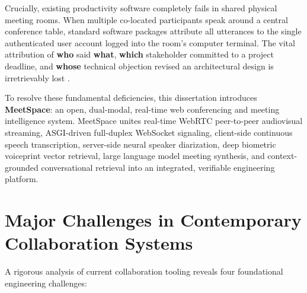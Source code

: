 \documentclass[12pt,oneside,letterpaper]{report}
\numberwithin{equation}{chapter} %
\begin{document}
Crucially, existing productivity software completely fails in shared physical meeting rooms. When multiple co-located participants speak around a central conference table, standard software packages attribute all utterances to the single authenticated user account logged into the room's computer terminal. The vital attribution of \textbf{who} said \textbf{what}, \textbf{which} stakeholder committed to a project deadline, and \textbf{whose} technical objection revised an architectural design is irretrievably lost \cite{qian2022single}.

To resolve these fundamental deficiencies, this dissertation introduces \textbf{MeetSpace}: an open, dual-modal, real-time web conferencing and meeting intelligence system. MeetSpace unites real-time WebRTC peer-to-peer audiovisual streaming, ASGI-driven full-duplex WebSocket signaling, client-side continuous speech transcription, server-side neural speaker diarization, deep biometric voiceprint vector retrieval, large language model meeting synthesis, and context-grounded conversational retrieval into an integrated, verifiable engineering platform.

\section{Major Challenges in Contemporary Collaboration Systems}
A rigorous analysis of current collaboration tooling reveals four foundational engineering challenges:
\end{document}
